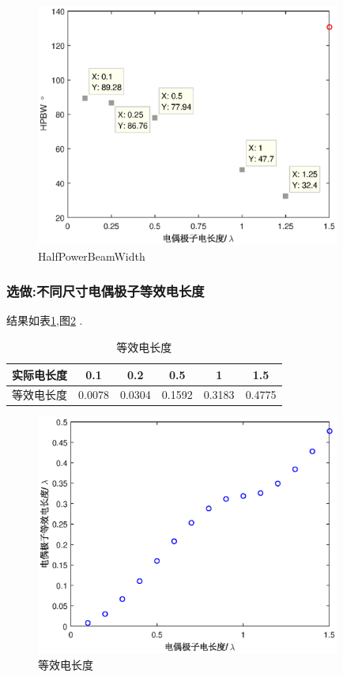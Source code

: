 \begin{figure}[!ht]
\centering
\includegraphics[width=10cm]{Dipole_3dB_beamwidth.eps}
\caption{HalfPowerBeamWidth} \label{fig:DP3dB}
\end{figure}
\subsubsection{选做:不同尺寸电偶极子等效电长度}
结果如表\ref{tab:EQ_L},图\ref{fig:DP_EQ_L} .
\\
\begin{table}[!ht]
\centering
\begin{tabular}{cccccc}
\toprule
实际电长度&0.1 &0.2&0.5&1&1.5\\
\midrule
等效电长度&0.0078&0.0304&0.1592&0.3183&0.4775\\
\bottomrule
\end{tabular}
\caption{等效电长度} \label{tab:EQ_L}
\end{table}

\begin{figure}[!ht]
\centering
\includegraphics[width=10cm]{Dipole_Eq_length.eps}
\caption{等效电长度} \label{fig:DP_EQ_L}
\end{figure}
